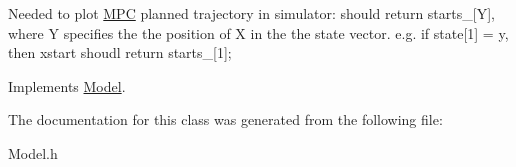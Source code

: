 Needed to plot \mbox{\hyperlink{classMPC}{M\+PC}} planned trajectory in simulator\+: should return starts\+\_\+\mbox{[}Y\mbox{]}, where Y specifies the the position of X in the the state vector. e.\+g. if state\mbox{[}1\mbox{]} = y, then xstart shoudl return starts\+\_\+\mbox{[}1\mbox{]}; 

Implements \mbox{\hyperlink{classModel_ae505a277c05e465d0a41fa75d4116350}{Model}}.



The documentation for this class was generated from the following file\+:\begin{DoxyCompactItemize}
\item 
Model.\+h\end{DoxyCompactItemize}
